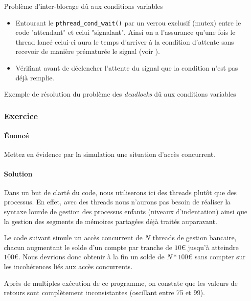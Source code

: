 \documentclass[a4paper, 12pt]{article}
\begin{document}
\begin{enumerate}
    {Problème d'inter-blocage dû aux conditions variables}
    \begin{itemize}
        \item Entourant le \verb?pthread_cond_wait()? par un verrou exclusif (mutex) entre le code "attendant" et celui "signalant". Ainsi on a l'assurance qu'une fois le thread lancé celui-ci aura le temps d'arriver à la condition d'attente sans recevoir de manière prématurée le signal (voir ). 
        \item Vérifiant avant de déclencher l'attente du signal que la condition n'est pas déjà remplie.
    \end{itemize}
    {Exemple de résolution du problème des \emph{deadlocks} dû aux conditions variables}
\end{enumerate}

\subsubsection{Exercice}

\paragraph{Énoncé\\}
Mettez en évidence par la simulation une situation d'accès concurrent.

\paragraph{Solution\\}
Dans un but de clarté du code, nous utiliserons ici des threads plutôt que des processus. En effet, avec des threads nous n'aurons pas besoin de réaliser la syntaxe lourde de gestion des processus enfants (niveaux d'indentation) ainsi que la gestion des segments de mémoires partagées déjà traités auparavant.

Le code suivant simule un accès concurrent de $N$ threads de gestion bancaire, chacun augmentant le solde d'un compte par tranche de $10 \euro$  jusqu'à atteindre $ 100 \euro$. Nous devrions donc obtenir à la fin un solde de $N*100 \euro$ sans compter sur les incohérences liés aux accès concurrents.




Après de multiples exécution de ce programme, on constate que les valeurs de retours sont complètement inconsistantes (oscillant entre 75 et 99).
\end{document}
